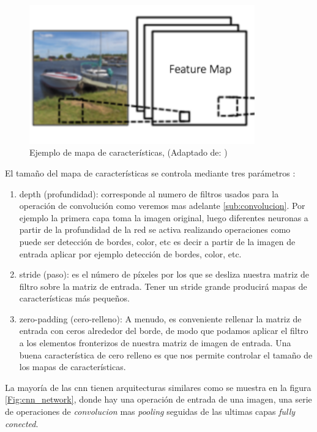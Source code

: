 \begin{figure}[H]
 \centering
  \includegraphics[height=6cm,keepaspectratio=true,clip=true]{imagenes/MarcoTeorico/fmaps.png}
  \caption{Ejemplo de mapa de características, (Adaptado de: \citep{cnnsarticle})}
	\label{Fig: fmaps}
\end{figure}

El tamaño del mapa de características se controla mediante tres parámetros \citep{cnnsarticle}:
\begin{enumerate}
\item depth (profundidad): corresponde al numero de filtros usados para la operación de convolución como veremos mas adelante \ref{sub:convolucion}. Por ejemplo la primera capa toma la imagen original, luego diferentes neuronas a partir de la profundidad de la red se activa realizando operaciones como puede ser detección de bordes, color, etc
es decir a partir de la imagen de entrada aplicar por ejemplo detección de bordes, color, etc.
\item stride (paso): es el número de píxeles por los que se desliza nuestra matriz de filtro sobre la matriz de entrada. Tener un stride grande producirá mapas de características más pequeños.
\item zero-padding (cero-relleno): A menudo, es conveniente rellenar la matriz de entrada con ceros alrededor del borde, de modo que podamos aplicar el filtro a los elementos fronterizos de nuestra matriz de imagen de entrada. Una buena característica de cero relleno es que nos permite controlar el tamaño de los mapas de características.
\end{enumerate}

La mayoría de las \ac{cnn} tienen arquitecturas similares como se muestra en la figura \ref{Fig:cnn_network}, donde hay una operación de entrada de una imagen, una serie de operaciones de  \textit{convolucion} mas  \textit{pooling} seguidas de las ultimas capas \textit{fully conected}. 

